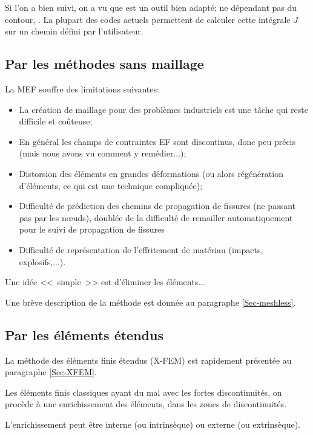 \medskip
Si l'on a bien suivi, on a vu que  est un outil bien adapté: ne
dépendant pas du contour, .
La plupart des codes actuels permettent de calculer cette intégrale $J$ sur un chemin
défini par l'utilisateur.



\medskip
\subsection{Par les méthodes sans maillage}

La MEF souffre des limitations suivantes:
\begin{itemize}
   \item  La création de maillage pour des problèmes industriels est une tâche qui reste
	difficile et coûteuse;
   \item  En général les champs de contraintes EF sont discontinus, donc peu précis (mais
	nous avons vu comment y remédier...);
   \item  Distorsion des éléments en grandes déformations (ou alors régénération
	d'éléments, ce qui est une technique compliquée);
   \item  Difficulté de prédiction des chemins de propagation de fissures (ne passant pas par
	les nœuds), doublée de la difficulté de remailler automatiquement pour le suivi de
	propagation de fissures
   \item  Difficulté de représentation de l'effritement de matériau (impacts, explosifs,...).
\end{itemize}
Une idée <<~simple~>> est d'éliminer les éléments...

\medskip
Une brève description de la méthode est donnée au paragraphe \ref{Sec-meshless}.


\medskip
\subsection{Par les éléments étendus}

La méthode des éléments finis étendus (X-FEM) est rapidement présentée au
paragraphe \ref{Sec-XFEM}.

\medskip
Les éléments finis classiques ayant du mal avec les fortes discontinuités, on procède
à une enrichissement des éléments, dans les zones de discontinuités.

L'enrichissement peut être interne (ou intrinsèque) ou externe (ou extrinsèque).

